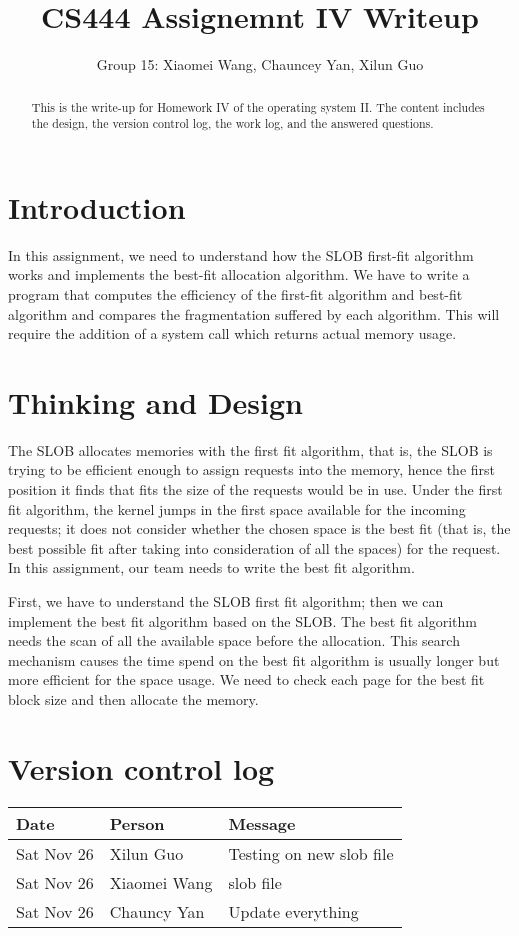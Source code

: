 \documentclass[a4paper]{article}
\title{CS444 Assignemnt IV Writeup}
\author{Group 15: Xiaomei Wang, Chauncey Yan, Xilun Guo}
\begin{document}
\maketitle

\begin{abstract}
This is the write-up for Homework IV of the operating system II. The content includes the design, the version control log, the work log, and the answered questions.
\end{abstract}

\section{Introduction}
In this assignment, we need to understand how the SLOB first-fit algorithm works and implements the best-fit allocation algorithm.  We have to write a program that computes the efficiency of the first-fit algorithm and best-fit algorithm and compares the fragmentation suffered by each algorithm. This will require the addition of a system call which returns actual memory usage.

\section{Thinking and Design}
The SLOB allocates memories with the first fit algorithm, that is, the SLOB is trying to be efficient enough to assign requests into the memory, hence the first position it finds that fits the size of the requests would be in use. Under the first fit algorithm, the kernel jumps in the first space available for the incoming requests; it does not consider whether the chosen space is the best fit (that is, the best possible fit after taking into consideration of all the spaces) for the request. In this assignment, our team needs to write the best fit algorithm.

First, we have to understand the SLOB first fit algorithm; then we can implement the best fit algorithm based on the SLOB. The best fit algorithm needs the scan of all the available space before the allocation. This search mechanism causes the time spend on the best fit algorithm is usually longer but more efficient for the space usage. We need to check each page for the best fit block size and then allocate the memory.

\section{Version control log}
\begin{tabular}{ | l | l | l |}
    \hline
     Date & Person & Message \\ \hline
     Sat Nov 26 & Xilun Guo    &  Testing on new slob file\\ \hline
     Sat Nov 26 & Xiaomei Wang &  slob file\\ \hline  
     Sat Nov 26 & Chauncy Yan  &  Update everything \\ \hline 
\end{tabular}
\end{document}
